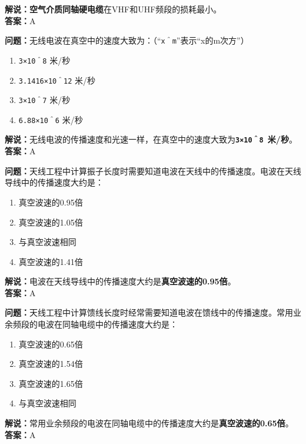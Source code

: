 \textbf{解说：}\textbf{空气介质同轴硬电缆}在VHF和UHF频段的损耗最小。\\\textbf{答案：}A%



\textbf{问题：}无线电波在真空中的速度大致为：（“\texttt{x＾m}”表示“x的m次方”）

\begin{enumerate}[label=\Alph*), leftmargin=1.5cm]
	\item \texttt{3×10＾8} 米/秒
	\item \texttt{3.1416×10＾12} 米/秒
	\item \texttt{3×10＾7} 米/秒
	\item \texttt{6.88×10＾6} 米/秒
\end{enumerate}

\textbf{解说：}无线电波的传播速度和光速一样，在真空中的速度大致为\textbf{\texttt{3×10＾8 }米/秒}。\\\textbf{答案：}A%



\textbf{问题：}天线工程中计算振子长度时需要知道电波在天线中的传播速度。电波在天线导线中的传播速度大约是：

\begin{enumerate}[label=\Alph*), leftmargin=1.5cm]
	\item 真空波速的0.95倍
	\item 真空波速的1.05倍
	\item 与真空波速相同
	\item 真空波速的1.41倍
\end{enumerate}

\textbf{解说：}电波在天线导线中的传播速度大约是\textbf{真空波速的0.95倍}。\\\textbf{答案：}A%



\textbf{问题：}天线工程中计算馈线长度时经常需要知道电波在馈线中的传播速度。常用业余频段的电波在同轴电缆中的传播速度大约是：

\begin{enumerate}[label=\Alph*), leftmargin=1.5cm]
	\item 真空波速的0.65倍
	\item 真空波速的1.54倍
	\item 真空波速的1.65倍
	\item 与真空波速相同
\end{enumerate}

\textbf{解说：}常用业余频段的电波在同轴电缆中的传播速度大约是\textbf{真空波速的0.65倍}。\\\textbf{答案：}A%




